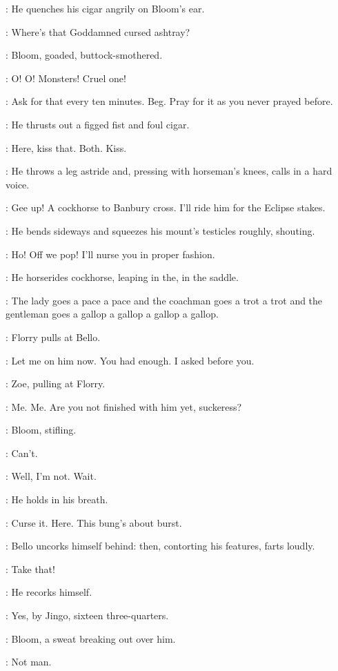 :
He quenches his cigar angrily on Bloom's ear.

\Bello:
Where's that Goddamned cursed ashtray?

:
Bloom, goaded, buttock-smothered.

\Bloom:
O! O!
Monsters!
Cruel one!

\Bello:
Ask for that every ten minutes. Beg.
Pray for it as you never prayed before.

:
He thrusts out a figged fist and foul cigar.

\Bello:
Here, kiss that.
Both. Kiss.

:
He throws a leg astride and,
pressing with horseman's knees, calls in a hard voice.

\Bello:
Gee up!
A cockhorse to Banbury cross.
I'll ride him for the Eclipse stakes.

:
He bends sideways and squeezes his mount's testicles roughly, shouting.

\Bello:
Ho! Off we pop!
I'll nurse you in proper fashion.

:
He horserides cockhorse, leaping in the, in the saddle.

\Bello:
The lady goes a pace a pace and the coachman goes a trot a trot
and the gentleman goes a gallop a gallop a gallop a gallop.

:
Florry pulls at Bello.

\Florry:
Let me on him now.
You had enough.
I asked before you.

:
Zoe, pulling at Florry.

\Zoe:
Me. Me.
Are you not finished with him yet, suckeress?

:
Bloom, stifling.

\Bloom:
Can't.

\Bello:
Well, I'm not.
Wait.

:
He holds in his breath.

\Bello:
Curse it.
Here.
This bung's about burst.

:
Bello uncorks himself behind:
then, contorting his features, farts loudly.


\Bello:
Take that!

:
He recorks himself.

\Bello:
Yes, by Jingo, sixteen three-quarters.%

:
Bloom, a sweat breaking out over him.

\Bloom:
Not man.

